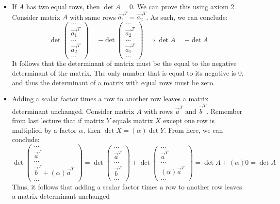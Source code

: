 \documentclass[12pt]{amsart}
\begin{document}
\begin{itemize}
	\item If $A$ has two equal rows, then $\det A = 0$. We can prove this using axiom 2. Consider matrix $A$ with same rows $\vec{a_1}^T = \vec{a_2}^T$. As such, we can conclude:
	\[\det \begin{pmatrix}\dots\\\vec{a_1}^T\\\dots\\\vec{a_2}^T\\\dots\end{pmatrix} = - \det \begin{pmatrix}\dots\\\vec{a_2}^T\\\dots\\\vec{a_1}^T\\\dots\end{pmatrix} \implies \det A = - \det A\]
		It follows that the determinant of matrix must be the equal to the negative determinant of the matrix. The only number that is equal to its negative is 0, and thus the determinant of a matrix with equal rows must be zero.
	\item Adding a scalar factor times a row to another row leaves a matrix determinant unchanged. Consider matrix $A$ with rows $\vec{a}^T$ and $\vec{b}^T$. Remember from last lecture that if matrix $Y$ equals matrix $X$ except one row is multiplied by a factor $\alpha$, then $\det X = (\alpha) \det Y$. From here, we can conclude:
		\[\det \begin{pmatrix}\dots\\\vec{a}^T\\\dots\\\vec{b}^T + (\alpha) \vec{a}^T\\\dots\end{pmatrix} = 
		  \det \begin{pmatrix}\dots\\\vec{a}^T\\\dots\\\vec{b}^T\\\dots\end{pmatrix} +
		  \det \begin{pmatrix}\dots\\\vec{a}^T\\\dots\\(\alpha) \vec{a}^T\\\dots\end{pmatrix} = 
		  \det A + (\alpha)0 = \det A\]
		Thus, it follows that adding a scalar factor times a row to another row leaves a matrix determinant unchanged

\end{itemize}
\end{document}
